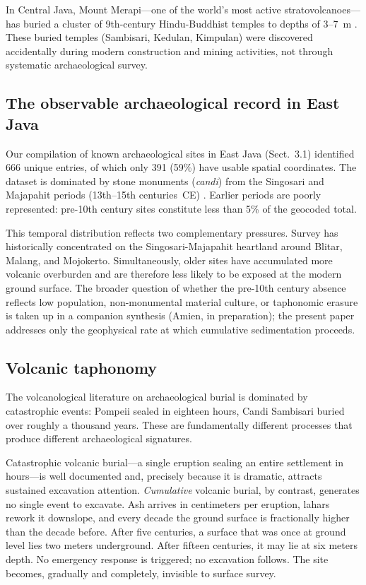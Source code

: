 \documentclass[12pt,a4paper]{article}
\begin{document}
In Central Java, Mount Merapi---one of the world's most active stratovolcanoes---has buried a cluster of 9th-century Hindu-Buddhist temples to depths of 3--7~m \citep{lavigne2000,thouret2000}. These buried temples (Sambisari, Kedulan, Kimpulan) were discovered accidentally during modern construction and mining activities, not through systematic archaeological survey.

\subsection{The observable archaeological record in East Java}

Our compilation of known archaeological sites in East Java (Sect.~3.1) identified 666 unique entries, of which only 391 (59\%) have usable spatial coordinates. The dataset is dominated by stone monuments (\textit{candi}) from the Singosari and Majapahit periods (13th--15th centuries~CE) \citep{kinney2003}. Earlier periods are poorly represented: pre-10th century sites constitute less than 5\% of the geocoded total.

This temporal distribution reflects two complementary pressures. Survey has historically concentrated on the Singosari-Majapahit heartland around Blitar, Malang, and Mojokerto. Simultaneously, older sites have accumulated more volcanic overburden and are therefore less likely to be exposed at the modern ground surface. The broader question of whether the pre-10th century absence reflects low population, non-monumental material culture, or taphonomic erasure is taken up in a companion synthesis (Amien, in preparation); the present paper addresses only the geophysical rate at which cumulative sedimentation proceeds.

\subsection{Volcanic taphonomy}

The volcanological literature on archaeological burial is dominated by catastrophic events: Pompeii sealed in eighteen hours, Candi Sambisari buried over roughly a thousand years. These are fundamentally different processes that produce different archaeological signatures.

Catastrophic volcanic burial---a single eruption sealing an entire settlement in hours---is well documented \citep{sigurdsson1985,doumas1983,sheets1992} and, precisely because it is dramatic, attracts sustained excavation attention. \textit{Cumulative} volcanic burial, by contrast, generates no single event to excavate. Ash arrives in centimeters per eruption, lahars rework it downslope, and every decade the ground surface is fractionally higher than the decade before. After five centuries, a surface that was once at ground level lies two meters underground. After fifteen centuries, it may lie at six meters depth. No emergency response is triggered; no excavation follows. The site becomes, gradually and completely, invisible to surface survey.
\end{document}
